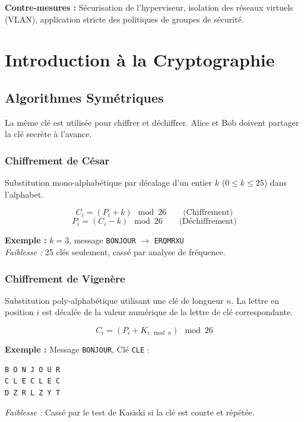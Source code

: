 \textbf{Contre-mesures :} Sécurisation de l'hyperviseur, isolation des réseaux virtuels (VLAN), application stricte des politiques de groupes de sécurité.

\section{Introduction à la Cryptographie}

\subsection{Algorithmes Symétriques}

La même clé est utilisée pour chiffrer et déchiffrer. Alice et Bob doivent partager la clé secrète à l'avance.

\subsubsection{Chiffrement de César}
Substitution mono-alphabétique par décalage d'un entier $k$ ($0 \leq k \leq 25$) dans l'alphabet.

\[
C_i = (P_i + k) \mod 26 \qquad \text{(Chiffrement)}
\]
\[
P_i = (C_i - k) \mod 26 \qquad \text{(Déchiffrement)}
\]

\begin{boxlizbiz}
\textbf{Exemple :} $k=3$, message \texttt{BONJOUR} $\rightarrow$ \texttt{ERQMRXU}\\
\textit{Faiblesse :} 25 clés seulement, cassé par analyse de fréquence.
\end{boxlizbiz}

\subsubsection{Chiffrement de Vigenère}
Substitution poly-alphabétique utilisant une clé de longueur $n$. La lettre en position $i$ est décalée de la valeur numérique de la lettre de clé correspondante.

\[
C_i = (P_i + K_{i \mod n}) \mod 26
\]

\begin{boxlizbiz}
\textbf{Exemple :} Message \texttt{BONJOUR}, Clé \texttt{CLE} :
\begin{verbatim}
B O N J O U R
C L E C L E C
D Z R L Z Y T
\end{verbatim}
\textit{Faiblesse :} Cassé par le test de Kasiski si la clé est courte et répétée.
\end{boxlizbiz}

